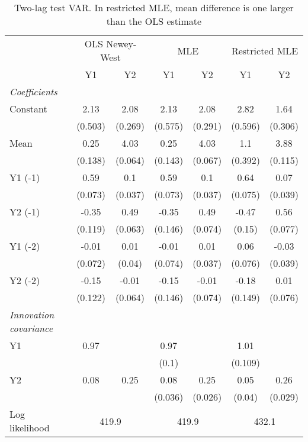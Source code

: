 \begin{table}[htbp] 
	\centering 
	\begin{tabular}{@{\extracolsep{4pt}}lcccccc@{}}		\hline\hline
		 		 & \multicolumn{2}{c}{OLS Newey-West} &\multicolumn{2}{c}{MLE} &\multicolumn{2}{c}{Restricted MLE} \\ 
 		 & Y1 	 & Y2 	 & Y1 	 & Y2 	 & Y1 	 & Y2\\\cline{2-3}\cline{4-5}\cline{6-7}
\rule{0pt}{4ex} 
 \emph{Coefficients} 	  		 & 		 & 		 & 		 & 		 & 		 &\\ 
\quad Constant 	 & 2.13 	 & 2.08 	 & 2.13 	 & 2.08 	 & 2.82 	 & 1.64	 \\ 
 		 & (0.503) 	 & (0.269) 	 & (0.575) 	 & (0.291) 	 & (0.596) 	 & (0.306) 	 \\ 
\quad Mean 	 & 0.25 	 & 4.03 	 & 0.25 	 & 4.03 	 & 1.1 	 & 3.88	 \\ 
 		 & (0.138) 	 & (0.064) 	 & (0.143) 	 & (0.067) 	 & (0.392) 	 & (0.115) 	 \\ 
\quad Y1 (-1) 	 &0.59 	 & 0.1 	 & 0.59 	 & 0.1 	 & 0.64 	 & 0.07	 \\ 
 		 & (0.073) 	 & (0.037) 	 & (0.073) 	 & (0.037) 	 & (0.075) 	 & (0.039) 	 \\ 
\quad Y2 (-1) 	 &-0.35 	 & 0.49 	 & -0.35 	 & 0.49 	 & -0.47 	 & 0.56	 \\ 
 		 & (0.119) 	 & (0.063) 	 & (0.146) 	 & (0.074) 	 & (0.15) 	 & (0.077) 	 \\ 
\quad Y1 (-2) 	 &-0.01 	 & 0.01 	 & -0.01 	 & 0.01 	 & 0.06 	 & -0.03	 \\ 
 		 & (0.072) 	 & (0.04) 	 & (0.074) 	 & (0.037) 	 & (0.076) 	 & (0.039) 	 \\ 
\quad Y2 (-2) 	 &-0.15 	 & -0.01 	 & -0.15 	 & -0.01 	 & -0.18 	 & 0.01	 \\ 
 		 & (0.122) 	 & (0.064) 	 & (0.146) 	 & (0.074) 	 & (0.149) 	 & (0.076) 	 \\ 
\rule{0pt}{4ex} \emph{Innovation covariance}  	 & 	 & 	 & 	 & 	 & 	 &\\ 
\quad Y1 	 &0.97 	 &  	 & 0.97 	 &  	 & 1.01 	 & 	 \\ 
 		 &  	 &  	 & (0.1) 	 &  	 & (0.109) 	 &  	 \\ 
\quad Y2 	 &0.08 	 & 0.25 	 & 0.08 	 & 0.25 	 & 0.05 	 & 0.26	 \\ 
 		 &  	 &  	 & (0.036) 	 & (0.026) 	 & (0.04) 	 & (0.029) 	 \\ 
 \hline \rule{0pt}{4ex} 
  Log likelihood 	 &\multicolumn{2}{c}{419.9} 	 & \multicolumn{2}{c}{419.9} 	 & \multicolumn{2}{c}{432.1}\\ 

 \hline 	\end{tabular}		\caption{Two-lag test VAR. In restricted MLE, mean difference is one
           larger than the OLS estimate}
		\label{tab:twolag}

\end{table}